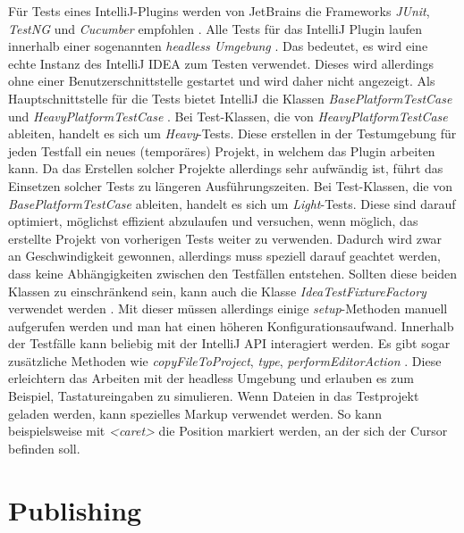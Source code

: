 Für Tests eines IntelliJ-Plugins werden von JetBrains 
die Frameworks \emph{JUnit}, \emph{TestNG} und \emph{Cucumber} empfohlen
\cite{IntelliJPlatformSDKTestsAndFixtures}. 
Alle Tests für das IntelliJ Plugin laufen innerhalb einer sogenannten
\emph{headless Umgebung} \cite{IntelliJPlatformSDKTestingOverview}. 
Das bedeutet, es wird eine echte Instanz
des IntelliJ IDEA zum Testen verwendet. Dieses wird allerdings ohne einer
Benutzerschnittstelle gestartet und wird daher nicht angezeigt.
Als Hauptschnittstelle für die Tests bietet IntelliJ die Klassen
\emph{BasePlatformTestCase} und \emph{HeavyPlatformTestCase}
\cite{IntelliJPlatformSDKLightAndHeavyTests}.
Bei Test-Klassen, die von \emph{HeavyPlatformTestCase} ableiten,
handelt es sich um \emph{Heavy}-Tests. Diese erstellen in
der Testumgebung für jeden Testfall ein neues (temporäres)
Projekt, in welchem das Plugin arbeiten kann. Da das Erstellen solcher
Projekte allerdings sehr aufwändig ist, führt das Einsetzen solcher
Tests zu längeren Ausführungszeiten.
Bei Test-Klassen, die von \emph{BasePlatformTestCase} ableiten,
handelt es sich um \emph{Light}-Tests. Diese sind darauf optimiert,
möglichst effizient abzulaufen und versuchen, wenn möglich, das 
erstellte Projekt von vorherigen Tests weiter zu verwenden.
Dadurch wird zwar an Geschwindigkeit gewonnen, allerdings
muss speziell darauf geachtet werden, dass keine Abhängigkeiten zwischen
den Testfällen entstehen.
Sollten diese beiden Klassen zu einschränkend sein, kann auch die
Klasse \emph{IdeaTestFixtureFactory} verwendet werden
\cite{IntelliJPlatformSDKTestsAndFixtures}. Mit dieser
müssen allerdings einige \emph{setup}-Methoden manuell aufgerufen
werden und man hat einen höheren Konfigurationsaufwand.
Innerhalb der Testfälle kann beliebig mit der IntelliJ API interagiert
werden. Es gibt sogar zusätzliche Methoden wie \emph{copyFileToProject},
\emph{type}, \emph{performEditorAction}
\cite{IntelliJPlatformSDKTestProjectAndTestdataDirectories,IntelliJPlatformSDKWritingTests}. 
Diese erleichtern das Arbeiten mit der headless Umgebung 
und erlauben es zum Beispiel, Tastatureingaben zu simulieren.
Wenn Dateien in das Testprojekt geladen werden, kann spezielles Markup
verwendet werden. So kann beispielsweise mit \emph{<caret>} die Position
markiert werden, an der sich der Cursor befinden soll.

\section{Publishing}
\label{sec:EntwicklungIntelliJ_Publishing}

